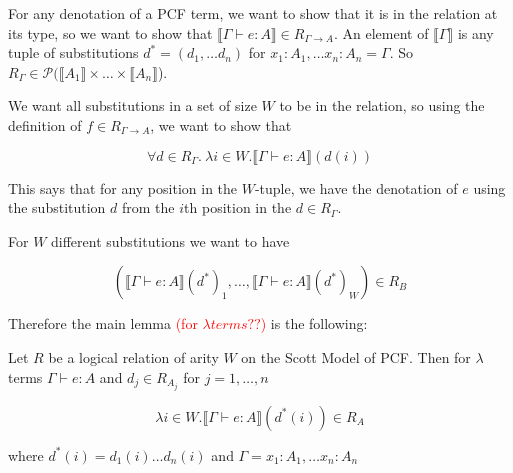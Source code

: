 \vspace{0.5cm}

For any denotation of a PCF term, we want to show that it is in the relation at its type, so we want to show that $\llbracket \Gamma \vdash e : A \rrbracket \in R_{\Gamma \to A}$. An element of $\llbracket \Gamma \rrbracket$ is any tuple of substitutions $d^* = (d_1, \dots d_n)$ for $x_1 : A_1, \dots x_n :A_n = \Gamma$. So $R_\Gamma \in \mathcal{P}(\llbracket A_1 \rrbracket \times \dots \times \llbracket A_n \rrbracket$).

We want all substitutions in a set of size $W$ to be in the relation, so using the definition of $f \in R_{\Gamma \to A}$, we want to show that 

\[ \forall d \in R_\Gamma. \ \lambda i \in W. \llbracket \Gamma \vdash e : A \rrbracket(d(i))\]

This says that for any position in the $W$-tuple, we have the denotation of $e$ using the substitution $d$ from the $i$th position in the $d \in R_\Gamma$.

For $W$ different substitutions we want to have

\[(\llbracket \Gamma \vdash e : A \rrbracket(d^*)_1 , \dots, \llbracket \Gamma \vdash e : A \rrbracket(d^*)_W) \in R_B \]

Therefore the main lemma \textcolor{red}{(for $\lambda terms??$)} is the following:

\vspace{0.5cm}

\begin{lem}\label{main2}
Let $R$ be a logical relation of arity $W$ on the Scott Model of PCF. Then for $\lambda$ terms $\Gamma \vdash e : A$ and $d_j \in R_{A_j}$ for $j = 1, \dots, n$

\[ \lambda i \in W. \llbracket \Gamma \vdash e : A \rrbracket(d^*(i)) \in R_A\]

where $d^*(i) = d_1(i) \dots d_n(i)$ and $\Gamma = x_1 : A_1 , \dots x_n : A_n$
\end{lem}


%
%
%
%

